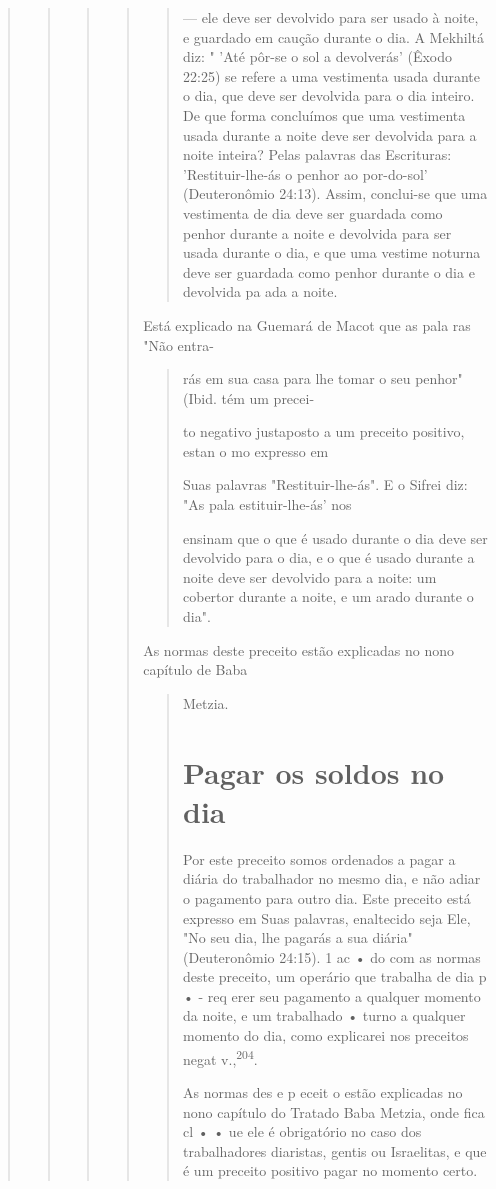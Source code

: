 \begin{quote}
\begin{quote}
\begin{quote}
\begin{quote}
\begin{quote}
--- ele deve ser devolvido para ser usado à noite, e guardado em caução
duran­te o dia. A Mekhiltá diz: " 'Até pôr-se o sol a devolverás' (Êxodo
22:25) se refe­re a uma vestimenta usada durante o dia, que deve ser
devolvida para o dia inteiro. De que forma concluímos que uma vestimenta
usada durante a noite deve ser devolvida para a noite inteira? Pelas
palavras das Escrituras: 'Restituir-lhe-ás o penhor ao por-do-sol'
(Deuteronômio 24:13). Assim, conclui-se que uma vestimenta de dia deve
ser guardada como penhor durante a noite e de­volvida para ser usada
durante o dia, e que uma vestime noturna deve ser guardada como penhor
durante o dia e devolvida pa ada a noite.
\end{quote}

Está explicado na Guemará de Macot que as pala ras "Não entra-

\begin{quote}
rás em sua casa para lhe tomar o seu penhor" (Ibid. tém um precei-

to negativo justaposto a um preceito positivo, estan o mo expresso em

Suas palavras "Restituir-lhe-ás". E o Sifrei diz: "As pala
estituir-lhe-ás' nos

ensinam que o que é usado durante o dia deve ser devolvido para o dia, e
o que é usado durante a noite deve ser devolvido para a noite: um
cobertor du­rante a noite, e um arado durante o dia".
\end{quote}

As normas deste preceito estão explicadas no nono capítulo de Baba

\begin{quote}
Metzia.

\section{Pagar os soldos no dia}

Por este preceito somos ordenados a pagar a diária do trabalhador no
mesmo dia, e não adiar o pagamento para outro dia. Este preceito está
ex­presso em Suas palavras, enaltecido seja Ele, "No seu dia, lhe
pagarás a sua diá­ria" (Deuteronômio 24:15). 1 ac • do com as normas
deste preceito, um ope­rário que trabalha de dia p • - req erer seu
pagamento a qualquer momento da noite, e um trabalhado • turno a
qualquer momento do dia, como expli­carei nos preceitos negat
v.,\textsuperscript{204}.

As normas des e p eceit o estão explicadas no nono capítulo do Tra­tado
Baba Metzia, onde fica cl • • ue ele é obrigatório no caso dos
trabalhado­res diaristas, gentis ou Israelitas, e que é um preceito
positivo pagar no momento certo.


\end{quote}
\end{quote}
\end{quote}
\end{quote}
\end{quote}
